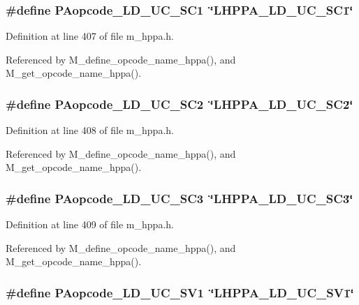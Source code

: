 \subsubsection{\setlength{\rightskip}{0pt plus 5cm}\#define PAopcode\_\-LD\_\-UC\_\-SC1~\char`\"{}LHPPA\_\-LD\_\-UC\_\-SC1\char`\"{}}\label{m__hppa_8h_a63a1ad4a543a2fef878b3c871210003}




Definition at line 407 of file m\_\-hppa.h.

Referenced by M\_\-define\_\-opcode\_\-name\_\-hppa(), and M\_\-get\_\-opcode\_\-name\_\-hppa().
\subsubsection{\setlength{\rightskip}{0pt plus 5cm}\#define PAopcode\_\-LD\_\-UC\_\-SC2~\char`\"{}LHPPA\_\-LD\_\-UC\_\-SC2\char`\"{}}\label{m__hppa_8h_5b21661811680c8f66efc1718cca131e}




Definition at line 408 of file m\_\-hppa.h.

Referenced by M\_\-define\_\-opcode\_\-name\_\-hppa(), and M\_\-get\_\-opcode\_\-name\_\-hppa().
\subsubsection{\setlength{\rightskip}{0pt plus 5cm}\#define PAopcode\_\-LD\_\-UC\_\-SC3~\char`\"{}LHPPA\_\-LD\_\-UC\_\-SC3\char`\"{}}\label{m__hppa_8h_5673a5330beec413ade506a99be363f7}




Definition at line 409 of file m\_\-hppa.h.

Referenced by M\_\-define\_\-opcode\_\-name\_\-hppa(), and M\_\-get\_\-opcode\_\-name\_\-hppa().
\subsubsection{\setlength{\rightskip}{0pt plus 5cm}\#define PAopcode\_\-LD\_\-UC\_\-SV1~\char`\"{}LHPPA\_\-LD\_\-UC\_\-SV1\char`\"{}}\label{m__hppa_8h_96af93cf41f8fb6cc33bd8016db51a04}




